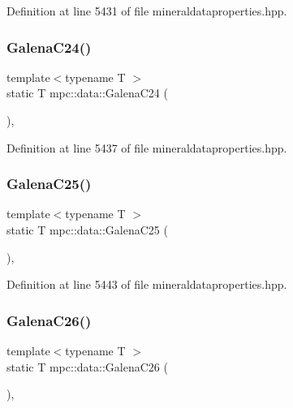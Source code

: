 Definition at line 5431 of file mineraldataproperties.\+hpp.

\mbox{\label{namespacempc_1_1data_a10a6d085c1acb8ffe1a512be8770a801}} 
\subsubsection{\texorpdfstring{Galena\+C24()}{GalenaC24()}}
{\footnotesize\ttfamily template$<$typename T $>$ \\
static T mpc\+::data\+::\+Galena\+C24 (\begin{DoxyParamCaption}{ }\end{DoxyParamCaption})\hspace{0.3cm}{\ttfamily [inline]}, {\ttfamily [static]}}



Definition at line 5437 of file mineraldataproperties.\+hpp.

\mbox{\label{namespacempc_1_1data_a3f073a2c2df002f2d161d2783bd45180}} 
\subsubsection{\texorpdfstring{Galena\+C25()}{GalenaC25()}}
{\footnotesize\ttfamily template$<$typename T $>$ \\
static T mpc\+::data\+::\+Galena\+C25 (\begin{DoxyParamCaption}{ }\end{DoxyParamCaption})\hspace{0.3cm}{\ttfamily [inline]}, {\ttfamily [static]}}



Definition at line 5443 of file mineraldataproperties.\+hpp.

\mbox{\label{namespacempc_1_1data_aa190de37519c3fff62e793851eb07a06}} 
\subsubsection{\texorpdfstring{Galena\+C26()}{GalenaC26()}}
{\footnotesize\ttfamily template$<$typename T $>$ \\
static T mpc\+::data\+::\+Galena\+C26 (\begin{DoxyParamCaption}{ }\end{DoxyParamCaption})\hspace{0.3cm}{\ttfamily [inline]}, {\ttfamily [static]}}



